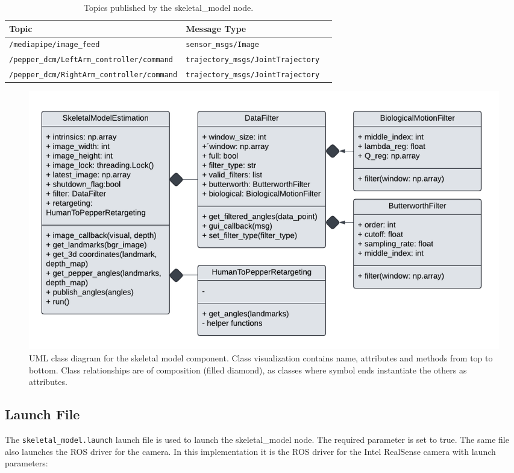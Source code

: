 \documentclass{CSSRforAfrica}
\begin{document}
\begin{longtable}[c]{|l|l|l|}
    \caption{Topics published by the skeletal\_model node.} \label{tab:Published_topics} \\
    \hline
    \rowcolor{gray!30}
    \footnotesize{\textbf{Topic}} & \footnotesize{\textbf{Message Type}} \\ \hline
    \endhead %
    
    \footnotesize{\texttt{/mediapipe/image\_feed}} & \footnotesize{\texttt{sensor\_msgs/Image}} \\ \hline
    \footnotesize{\texttt{/pepper\_dcm/LeftArm\_controller/command}} & \footnotesize{\texttt{trajectory\_msgs/JointTrajectory}} \\ \hline
    \footnotesize{\texttt{/pepper\_dcm/RightArm\_controller/command}} & \footnotesize{\texttt{trajectory\_msgs/JointTrajectory}} \\ \hline

\end{longtable}

\begin{figure}[H]
    \centering
    \includegraphics[width=\linewidth]{figures/skeletal_model.pdf}
    \caption{UML class diagram for the skeletal model component. Class visualization contains name, attributes and methods from top to bottom. Class relationships are of composition (filled diamond), as classes where symbol ends instantiate the others as attributes.}
    \label{fig:skeletaluml}
\end{figure}


\newpage
\subsection*{Launch File}
The \texttt{skeletal\_model.launch} launch file is used to launch the skeletal\_model node. The required parameter is set to true.
The same file also launches the ROS driver for the camera. In this implementation it is the ROS driver for the Intel RealSense camera with launch parameters:
\end{document}
